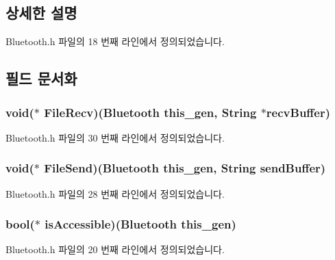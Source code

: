 \subsection{상세한 설명}


Bluetooth.\-h 파일의 18 번째 라인에서 정의되었습니다.



\subsection{필드 문서화}
\hypertarget{struct___bluetooth_a7c339952703ec4aa063f9db4a8561b85}{
\subsubsection[{File\-Recv}]{\setlength{\rightskip}{0pt plus 5cm}void($\ast$  File\-Recv)({\bf Bluetooth} this\-\_\-gen, {\bf String} $\ast$recv\-Buffer)}}\label{struct___bluetooth_a7c339952703ec4aa063f9db4a8561b85}


Bluetooth.\-h 파일의 30 번째 라인에서 정의되었습니다.

\hypertarget{struct___bluetooth_aa113a2cd73c6888e3a7d4694c6d626e5}{
\subsubsection[{File\-Send}]{\setlength{\rightskip}{0pt plus 5cm}void($\ast$  File\-Send)({\bf Bluetooth} this\-\_\-gen, {\bf String} send\-Buffer)}}\label{struct___bluetooth_aa113a2cd73c6888e3a7d4694c6d626e5}


Bluetooth.\-h 파일의 28 번째 라인에서 정의되었습니다.

\hypertarget{struct___bluetooth_a4d17357ef3f36198ec75747159ba463e}{
\subsubsection[{is\-Accessible}]{\setlength{\rightskip}{0pt plus 5cm}bool($\ast$  is\-Accessible)({\bf Bluetooth} this\-\_\-gen)}}\label{struct___bluetooth_a4d17357ef3f36198ec75747159ba463e}


Bluetooth.\-h 파일의 20 번째 라인에서 정의되었습니다.

